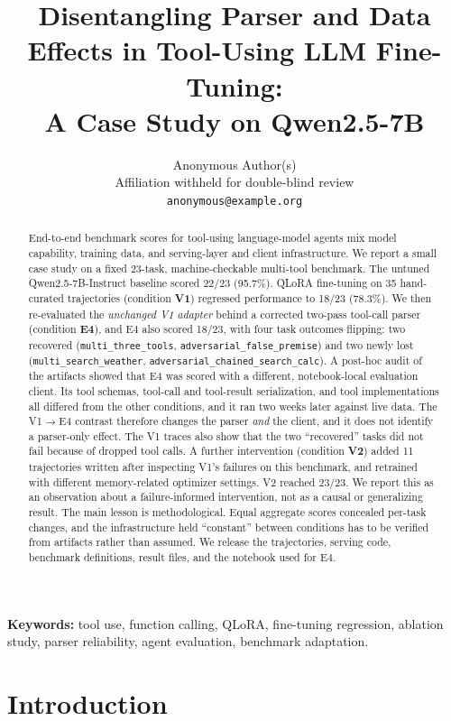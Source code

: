 \documentclass[10pt,twocolumn]{article}
\title{\bfseries Disentangling Parser and Data Effects in Tool-Using LLM Fine-Tuning:\\ A Case Study on Qwen2.5-7B}
\author{
  Anonymous Author(s)\\
  \small Affiliation withheld for double-blind review\\
  \small \texttt{anonymous@example.org}
}
\date{}
\newcommand{\code}[1]{\texttt{#1}}
\begin{document}
\maketitle

\begin{abstract}
\noindent
End-to-end benchmark scores for tool-using language-model agents mix model capability, training data, and serving-layer and client infrastructure. We report a small case study on a fixed 23-task, machine-checkable multi-tool benchmark. The untuned Qwen2.5-7B-Instruct baseline scored 22/23 (95.7\%). QLoRA fine-tuning on 35 hand-curated trajectories (condition \textbf{V1}) regressed performance to 18/23 (78.3\%). We then re-evaluated the \emph{unchanged V1 adapter} behind a corrected two-pass tool-call parser (condition \textbf{E4}), and E4 also scored 18/23, with four task outcomes flipping: two recovered (\code{multi\_three\_tools}, \code{adversarial\_false\_premise}) and two newly lost (\code{multi\_search\_weather}, \code{adversarial\_chained\_search\_calc}). A post-hoc audit of the artifacts showed that E4 was scored with a different, notebook-local evaluation client. Its tool schemas, tool-call and tool-result serialization, and tool implementations all differed from the other conditions, and it ran two weeks later against live data. The V1$\to$E4 contrast therefore changes the parser \emph{and} the client, and it does not identify a parser-only effect. The V1 traces also show that the two ``recovered'' tasks did not fail because of dropped tool calls. A further intervention (condition \textbf{V2}) added 11 trajectories written after inspecting V1's failures on this benchmark, and retrained with different memory-related optimizer settings. V2 reached 23/23. We report this as an observation about a failure-informed intervention, not as a causal or generalizing result. The main lesson is methodological. Equal aggregate scores concealed per-task changes, and the infrastructure held ``constant'' between conditions has to be verified from artifacts rather than assumed. We release the trajectories, serving code, benchmark definitions, result files, and the notebook used for E4.
\end{abstract}

\noindent\textbf{Keywords:} tool use, function calling, QLoRA, fine-tuning regression, ablation study, parser reliability, agent evaluation, benchmark adaptation.

\section{Introduction}
\end{document}
